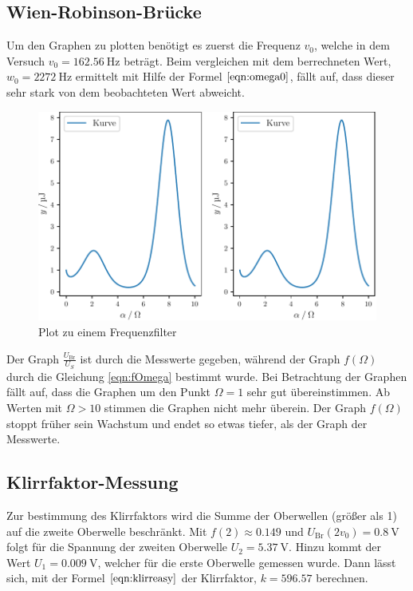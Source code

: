  \subsection{Wien-Robinson-Brücke}
 Um den Graphen zu plotten benötigt es zuerst die Frequenz $v_0$, welche in dem Versuch $v_0=\SI{162.56}{\hertz}$ beträgt.
 Beim vergleichen mit dem berrechneten Wert, $w_0= \SI{2272}{\hertz}$ ermittelt mit Hilfe der Formel $\ref{eqn:omega0}$, fällt auf, dass dieser
 sehr stark von dem beobachteten Wert abweicht.
 \begin{figure}
  \caption{Plot zu einem Frequenzfilter}
  \centering
  \includegraphics[width = \textwidth]{build/plot.pdf}
\end{figure}
Der Graph $\frac{U_\text{Br}}{U_S}$ ist durch die Messwerte gegeben, während der Graph $f(\Omega)$ durch die Gleichung \ref{eqn:fOmega} bestimmt wurde. 
Bei Betrachtung der Graphen fällt auf, dass die Graphen um den Punkt $\Omega=1$ sehr gut übereinstimmen.
Ab Werten mit $\Omega>10$ stimmen die Graphen nicht mehr überein. Der Graph $f(\Omega)$ stoppt früher sein Wachstum und endet so etwas tiefer, als der Graph der Messwerte.
\newpage 
\subsection{Klirrfaktor-Messung}
Zur bestimmung des Klirrfaktors wird die Summe der Oberwellen (größer als 1) auf die zweite Oberwelle beschränkt.
Mit $f(2)\approx 0.149$ und $U_\text{Br}(2v_0)=\SI{0.8}{\volt}$ folgt für die Spannung der zweiten Oberwelle $U_2=\SI{5.37}{\volt}$.
Hinzu kommt der Wert $U_1=\SI{0.009}{\volt}$, welcher für die erste Oberwelle gemessen wurde.
Dann lässt sich, mit der Formel $\ref{eqn:klirreasy}$ der Klirrfaktor, $k=596.57$ berechnen.
